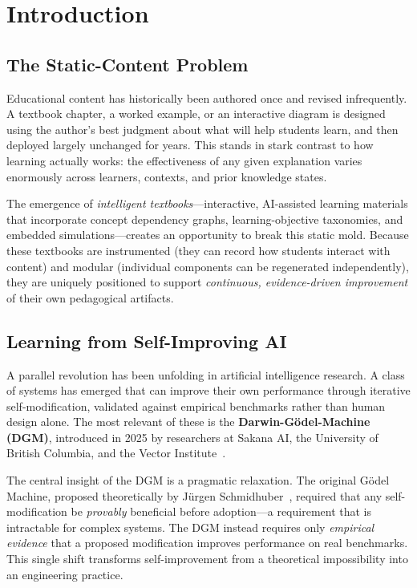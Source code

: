 \section{Introduction}

\subsection{The Static-Content Problem}

Educational content has historically been authored once and revised
infrequently. A textbook chapter, a worked example, or an interactive diagram
is designed using the author's best judgment about what will help students
learn, and then deployed largely unchanged for years. This stands in stark
contrast to how learning actually works: the effectiveness of any given
explanation varies enormously across learners, contexts, and prior knowledge
states.

The emergence of \textit{intelligent textbooks}---interactive, AI-assisted
learning materials that incorporate concept dependency graphs, learning-objective
taxonomies, and embedded simulations---creates an opportunity to break this
static mold. Because these textbooks are instrumented (they can record how
students interact with content) and modular (individual components can be
regenerated independently), they are uniquely positioned to support
\textit{continuous, evidence-driven improvement} of their own pedagogical
artifacts.

\subsection{Learning from Self-Improving AI}

A parallel revolution has been unfolding in artificial intelligence research.
A class of systems has emerged that can improve their own performance through
iterative self-modification, validated against empirical benchmarks rather than
human design alone. The most relevant of these is the
\textbf{Darwin-G\"{o}del-Machine (DGM)}, introduced in 2025 by researchers at
Sakana AI, the University of British Columbia, and the Vector
Institute~\cite{zhang2025dgm,sakana2025dgm}.

The central insight of the DGM is a pragmatic relaxation. The original
G\"{o}del Machine, proposed theoretically by J\"{u}rgen
Schmidhuber~\cite{schmidhuber2007goedel}, required that any self-modification
be \textit{provably} beneficial before adoption---a requirement that is
intractable for complex systems. The DGM instead requires only
\textit{empirical evidence} that a proposed modification improves performance
on real benchmarks. This single shift transforms self-improvement from a
theoretical impossibility into an engineering practice.

